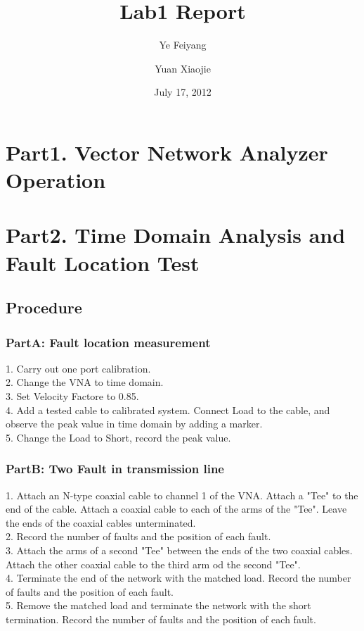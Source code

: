 \documentclass[11pt,oneside,a4paper]{report}
\begin{document}
\title{Lab1 Report}
\author{Ye Feiyang \and Yuan Xiaojie}
\date{July 17, 2012}
\maketitle

\section*{Part1. Vector Network Analyzer Operation}

\section*{Part2. Time Domain Analysis and Fault Location Test}
\subsection*{Procedure}
\subsubsection*{PartA: Fault location measurement}
1. Carry out one port calibration.\\
2. Change the VNA to time domain.\\
3. Set Velocity Factore to 0.85.\\
4. Add a tested cable to calibrated system. Connect Load to the cable, and observe the peak value in time domain by adding a marker.\\
5. Change the Load to Short, record the peak value.
\subsubsection*{PartB: Two Fault in transmission line}
1. Attach an N-type coaxial cable to channel 1 of the VNA. Attach a "Tee" to the end of the cable. Attach a coaxial cable to each of the arms of the "Tee". Leave the ends of the coaxial cables unterminated.\\
2. Record the number of faults and the position of each fault.\\
3. Attach the arms of a second "Tee" between the ends of the two coaxial cables. Attach the other coaxial cable to the third arm od the second "Tee".\\
4. Terminate the end of the network with the matched load. Record the number of faults and the position of each fault.\\
5. Remove the matched load and terminate the network with the short termination. Record the number of faults and the position of each fault.
\end{document}

